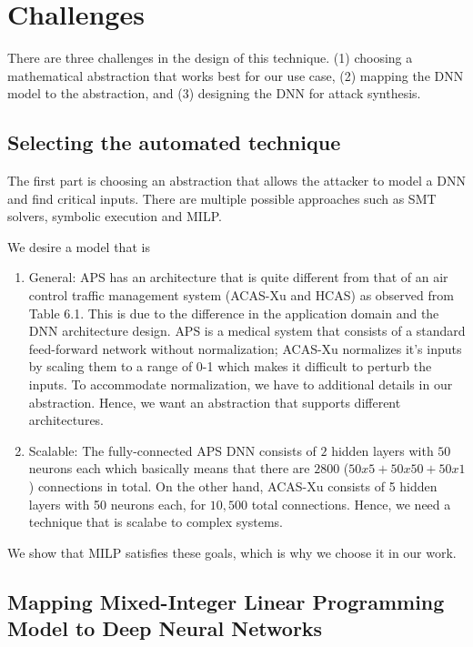 \section{Challenges}
There are three challenges in the design of this technique. 
(1) choosing a mathematical abstraction that works best for our use case, 
(2) mapping the \ac{DNN}  model to the abstraction, and 
(3) designing the \ac{DNN}  for attack synthesis.  


\subsection{Selecting  the automated technique}
The first part is choosing an abstraction that allows the attacker to model a DNN and find critical inputs. 
There are multiple possible approaches such as SMT solvers, symbolic execution and MILP.

We desire a model that is
\begin{enumerate}
	\item General: \ac{APS} has an architecture that %
	is quite different from that of an air control traffic management system (\ac{ACAS-Xu} and \ac{HCAS}) as observed from Table 6.1.
	This is due to the difference in the application domain and the \ac{DNN} architecture design. 
	\ac{APS} is a medical system that consists of a standard feed-forward network without normalization; \ac{ACAS-Xu} normalizes it's inputs by scaling them to a range of {0-1} which makes it difficult to perturb the inputs. 
	To accommodate normalization, we have to additional details in our abstraction.  
	Hence, we want an abstraction that supports different architectures. 
	\item Scalable: The fully-connected \ac{APS} \ac{DNN} consists of $2$ hidden layers with $50$ neurons each which basically means that there are $2800$ ($50x5 + 50x50 + 50x1$) connections in total.
	On the other hand, \ac{ACAS-Xu} consists of 5 hidden layers with 50 neurons each, for $10,500$ total connections. 
	Hence, we need a technique that is scalabe to complex systems. 
	
\end{enumerate}

 We show that \ac{MILP} satisfies these goals, which is why we choose it in our work. %


\subsection{ Mapping  Mixed-Integer Linear Programming Model to Deep Neural Networks}

